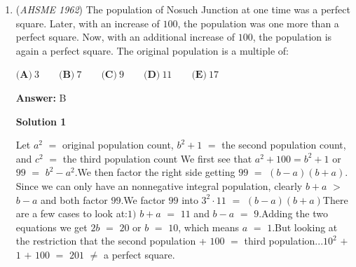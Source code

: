 \begin{enumerate}
 Finally, we see that $\frac{(x-\frac{1}{2})^2}{2}\geq0$, as:
 \[\left(x-\frac{1}{2}\right)^2\geq0\]So,
 \[\frac{(x-\frac{1}{2})^2}{2}\geq0,\]

 where the first inequality was from the Trivial Inequality, and the second came from dividing both sides by $2$, which does not change the inequality sign.Thus, the maximum area is $\boxed{\frac{5}{8}}$ or $\boxed{\textbf{(D)}},$ when $\frac{(x-\frac{1}{2})^2}{2} = 0.$




\textbf{Solution 3 (Calculus)}

Let $AE = AF = x$. 

 The area of the quadrilateral $CDFE$ can be expressed as $A = 1 - \frac{x^2}{2} - \frac{(1-x)}{2}$.

 By taking the derivative of $A$, we get $A' = -x + \frac{1}{2}$.

 We make $A' = 0$ and get the critical point $x = \frac{1}{2}$.

 Substituting $x = \frac{1}{2}$ , the maximum area is $\boxed{\frac{5}{8}}$ or $\boxed{\textbf{(D)}}$.

 



\textbf{Solution 4}

Plot the points of the quadrilateral (with the bottom left corner of the square being at the origin) to plug into shoelace formula:
 \[(0, 0), (0, 1-x), (x, 1), (1, 0)\]So, 
 \[\frac{-x^2+x+1}{2}\]Trying $1/2$ first, you get $5/8$. Any larger or smaller value gives an answer less than $5/8$. Therefore, the answer is $\boxed{D}$.

 


	\item (\textit{AHSME 1962}) The population of Nosuch Junction at one time was a perfect square. Later, with an increase of $100$, the population was one more than a perfect square. Now, with an additional increase of $100$, the population is again a perfect square. The original population is a multiple of:


 $\textbf{(A)}\ 3 \qquad  \textbf{(B)}\ 7 \qquad  \textbf{(C)}\ 9 \qquad  \textbf{(D)}\ 11 \qquad  \textbf{(E)}\ 17$

 \textbf{Answer: }B



\textbf{Solution 1}

Let $a^2$ $=$ original population count, $b^2+1$ $=$ the second population count, and $c^2$ $=$ the third population count We first see that $a^2 + 100 = b^2 + 1$ or $99$ $=$ $b^2-a^2$.We then factor the right side getting $99$ $=$ $(b-a)(b+a)$. Since we can only have an nonnegative integral population, clearly $b+a$ $>$ $b-a$ and both factor $99$.We factor $99$ into $3^2 \cdot 11$ $=$ $(b-a)(b+a)$There are a few cases to look at:$1)$ $b+a$ $=$ $11$ and $b-a$ $=$ $9$.Adding the two equations we get $2b$ $=$ $20$ or $b$ $=$ $10$, which means $a$ $=$ $1$.But looking at the restriction that the second population + $100$ $=$ third population...$10^2$ $+$ $1$ $+$ $100$ $=$ $201$ $\neq$ a perfect square.


\end{enumerate}
